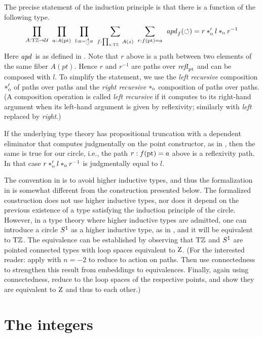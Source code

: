 \documentclass[a4,12pt]{amsart}
\begin{document}
The precise statement of the induction principle is that there is a 
function of the following type.
\[
  \thinmuskip=10mu              %
  \prod_{A: \TorZ\to\UU}
  \prod_{a: A(\pt)}
  \prod_{l: a=^A_{\Zloop} a}
  \sum_{f: \prod_{z:\TorZ} A(z)}
  \sum_{r: f(\pt)= a}
  {\apd{f}(\Zloop) = r\cto' l \cto r^{-1}}
\]
Here $\mathop{{\it apd}_{}}$ is as defined in \cite[Ch. 2.3]{hottbook}.
Note that $r$ above is a path between two elements of the same fiber $A(pt)$.
Hence $r$ and $r^{-1}$ are paths over $\mathop{{\it refl}_{{\mathord{\mathrm{pt}}}}}$ and can be composed with $l$.
To simplify the statement, we use the \emph{left recursive} 
composition $*_{\mathrm{o}}'$ of paths over paths and the \emph{right recursive} $*_{\mathrm{o}}$ composition of paths over paths.
(A composition operation is called \emph{left recursive} if it computes to its right-hand argument when its
 left-hand argument is given by reflexivity; similarly with \emph{left} replaced by \emph{right}.)

If the underlying type theory has propositional truncation with a dependent eliminator 
that computes judgmentally on the point constructor, as in \cite[Ch. 6.9]{hottbook},
then the same is true for our circle, i.e., the path $r : f({\mathord{\mathrm{pt}}})= a$ above is a reflexivity path.
In that case $r*_{\mathrm{o}}' l *_{\mathrm{o}} r^{-1}$ is judgmentally equal to $l$.   

The convention in {\UniMath} is to avoid higher inductive types, and thus
the formalization in \cite{circleind-Dan} is 
somewhat different from the construction presented below.
The formalized construction does not use higher inductive types, nor does it 
depend on the previous existence of a type satisfying the induction principle of the circle. 
However, in a type theory where higher inductive types are admitted,
one can introduce a circle ${S^1}$ as a higher inductive type, 
as in \cite[Ch. 6.1]{hottbook}, and it will be equivalent to ${\mathrm{T}\mathbb{Z}}$. 
The equivalence can be established by observing that ${\mathrm{T}\mathbb{Z}}$ and ${S^1}$ 
are pointed connected types with loop spaces equivalent to $\mathrm{Z}$.
(For the interested reader: apply \cite[Lemma 7.6.2]{hottbook} with $n=-2$
to reduce to action on paths. Then use connectedness to strengthen
this result from embeddings to equivalences. 
Finally, again using connectedness, reduce to the loop spaces
of the respective points, and show they are equivalent to $\mathrm{Z}$ and thus to each other.) 

\section{The integers}
\label{sec:integers}
\end{document}
